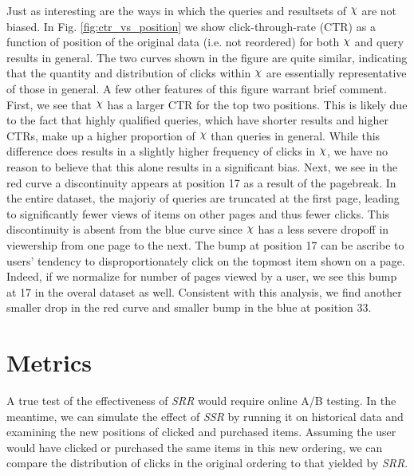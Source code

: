 \documentclass{article}
\def\Chi{\raisebox{2pt}{$\chi$}}
\begin{document}
Just as interesting are the ways in which the queries and resultsets of $\Chi$
are not biased. In Fig. \ref{fig:ctr_vs_position} we show click-through-rate
(CTR) as a function of position of the original data (i.e. not reordered) for
both $\Chi$ and query results in general. The two curves shown in the figure are
quite similar, indicating that the quantity and distribution of clicks within
$\Chi$ are essentially representative of those in general. A few other features
of this figure warrant brief comment. First, we see that $\Chi$ has a larger CTR
for the top two positions. This is likely due to the fact that highly qualified
queries, which have shorter results and higher CTRs,  make up a higher
proportion of $\Chi$ than queries in general. While this difference does results
in a slightly higher frequency of clicks in $\Chi$, we have no reason to believe
that this alone results in a significant bias. Next, we see in the red curve a
discontinuity appears at position 17 as a result of the pagebreak. In the entire
dataset, the majoriy of queries are truncated at the first page, leading to
significantly fewer views of items on other pages and thus fewer clicks. This
discontinuity is absent from the blue curve since $\Chi$ has a less severe
dropoff in viewership from one page to the next.  The bump at position 17 can be
ascribe to users' tendency to disproportionately click on the topmost item shown
on a page. Indeed, if we normalize for number of pages viewed by a user, we see
this bump at 17 in the overal dataset as well. Consistent with this analysis, we
find another smaller drop in the red curve and smaller bump in the blue at
position 33.

\section{Metrics}

A true test of the effectiveness of {\em SRR} would require online A/B
testing. In the meantime, we can simulate the effect of {\em SSR} by running it
on historical data and examining the new positions of clicked and purchased items.
Assuming the user would have clicked or purchased the same items in this new ordering, 
we can compare the distribution of clicks in the original ordering to that yielded 
by {\em SRR}.
\end{document}
